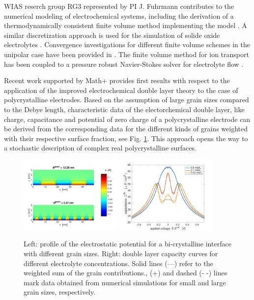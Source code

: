 \documentclass[a4paper,10pt]{article}
\begin{document}
WIAS reserch group RG3 represented by PI J. Fuhrmann contributes to the numerical modeling of electrochemical systems,
including the derivation of a thermodynamically consistent finite volume  method \cite{JF2016} implementing
the model \cite{DGL2014}. A similar discretization approach is used for the simulation
of solide oxide electrolytes \cite{VagnerEtAl2019}. Convergence investigations for different finite volume
schemes in the unipolar case have been  provided in \cite{CCFG2020}. The finite volume method for
ion transport has been coupled to a pressure robust Navier-Stokes solver for electrolyte flow
\cite{FGLMMSpringer2019,FuhrmannEtAlECActa2019}.


Recent work  supported by  Math+  \cite{JES} provides first  results with
respect to the application of the improved electrochemical double layer
theory to the case of polycrystalline  electrodes. Based on the assumption of large
grain sizes compared to the Debye length, characteristic data of the electorchemical double layer,
like charge, capacitance and potential of zero charge of a polycrystalline electrode can be derived from  the corresponding data
for the different kinds of grains weighted with their respective surface fraction,
see Fig. \ref{fig:JES}. This approach opens the way to
a stochastic description of complex real polycrystalline surfaces.

\begin{figure}
  \centering
  \includegraphics[width=0.45\textwidth]{phi_poly2d_gran.pdf}
  \includegraphics[width=0.45\textwidth]{c_2d_grain.pdf}
  \caption{Left: profile of the electrostatic potential for a bi-crystalline interface with different
    grain sizes.
    Right: double layer capacity curves for different electrolyte concentrations.
    Solid lines (—) refer to the weighted sum of the grain contributions.,
    (+) and dashed (- -) lines mark data obtained from numerical simulations for
    small and large grain sizes, respectively.
 \label{fig:JES}}
\end{figure}
\end{document}
